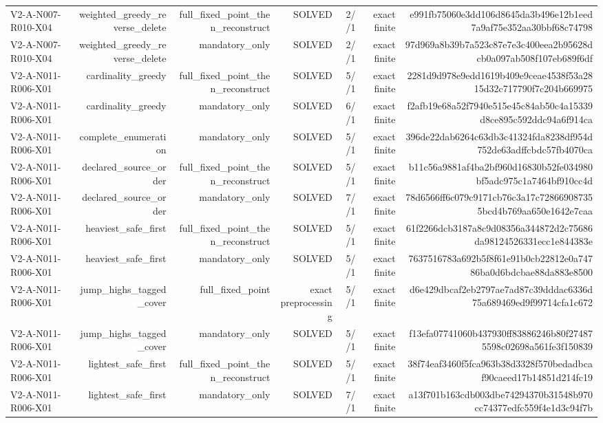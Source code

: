 {\begin{longtable}{lrrrrrr}
V2-A-N007-R010-X04 & weighted\_greedy\_reverse\_delete & full\_fixed\_point\_then\_reconstruct & SOLVED & 2//1 & exact finite & e991fb75060e3dd106d8645da3b496e12b1eed7a9af75e352aa30bbf68c74798 \\
V2-A-N007-R010-X04 & weighted\_greedy\_reverse\_delete & mandatory\_only & SOLVED & 2//1 & exact finite & 97d969a8b39b7a523c87e7e3c400eea2b95628dcb0a097ab508f107eb689f6df \\
V2-A-N011-R006-X01 & cardinality\_greedy & full\_fixed\_point\_then\_reconstruct & SOLVED & 5//1 & exact finite & 2281d9d978e9edd1619b409e9ceae4538f53a2815d32c717790f7c204b669975 \\
V2-A-N011-R006-X01 & cardinality\_greedy & mandatory\_only & SOLVED & 6//1 & exact finite & f2afb19e68a52f7940e515e45c84ab50c4a15339d8ce895c592ddc94a6f914ca \\
V2-A-N011-R006-X01 & complete\_enumeration & mandatory\_only & SOLVED & 5//1 & exact finite & 396de22dab6264c63db3c41324fda8238df954d752de63adffcbdc57fb4070ca \\
V2-A-N011-R006-X01 & declared\_source\_order & full\_fixed\_point\_then\_reconstruct & SOLVED & 5//1 & exact finite & b11c56a9881af4ba2bf960d16830b52fe034980bf5adc975c1a7464bf910cc4d \\
V2-A-N011-R006-X01 & declared\_source\_order & mandatory\_only & SOLVED & 7//1 & exact finite & 78d6566ff6c079c9171cb76c3a17c728669087355bcd4b769aa650e1642e7caa \\
V2-A-N011-R006-X01 & heaviest\_safe\_first & full\_fixed\_point\_then\_reconstruct & SOLVED & 5//1 & exact finite & 61f2266dcb3187a8c9d08356a344872d2c75686da98124526331ecc1e844383e \\
V2-A-N011-R006-X01 & heaviest\_safe\_first & mandatory\_only & SOLVED & 5//1 & exact finite & 7637516783a692b5f8f61e91b0cb22812e0a74786ba0d6bdcbae88da883e8500 \\
V2-A-N011-R006-X01 & jump\_highs\_tagged\_cover & full\_fixed\_point & exact preprocessing & 5//1 & exact finite & d6e429dbcaf2eb2797ae7ad87c39dddac6336d75a689469ed9f99714cfa1c672 \\
V2-A-N011-R006-X01 & jump\_highs\_tagged\_cover & mandatory\_only & SOLVED & 5//1 & exact finite & f13efa07741060b437930ff83886246b80f274875598c02698a561fe3f150839 \\
V2-A-N011-R006-X01 & lightest\_safe\_first & full\_fixed\_point\_then\_reconstruct & SOLVED & 5//1 & exact finite & 38f74eaf3460f5fca963b38d3328f570bedadbcaf90caeed17b14851d214fc19 \\
V2-A-N011-R006-X01 & lightest\_safe\_first & mandatory\_only & SOLVED & 7//1 & exact finite & a13f701b163cdb003dbe74294370b31548b970cc74377edfc559f4e1d3c94f7b \\

\end{longtable}}
